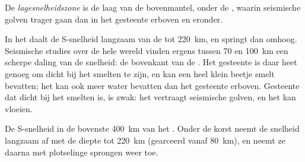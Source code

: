 \begin{definition}[Lagesnelheidszone]\label{def:g11:lithosphere-asthenosphere:lvz}
De \emph{lagesnelheidszone} is de laag van de bovenmantel,
onder de , waarin seismische golven trager gaan dan in het gesteente
erboven en eronder.
\end{definition}

In het  daalt de S-snelheid langzaam van de  tot
\qty{220}{km}, en springt dan omhoog. Seismische studies over de hele wereld vinden
ergens tussen 70 en \qty{100}{km} een scherpe daling van de snelheid: de bovenkant
van de . Het gesteente is daar heet genoeg om dicht bij het smelten te
zijn, en kan een heel klein beetje smelt bevatten; het kan ook meer water bevatten
dan het gesteente erboven. Gesteente dat dicht bij het smelten is, is zwak: het
vertraagt seismische golven, en het kan vloeien.

\begin{omfigure}

{\small De S-snelheid in de bovenste \qty{400}{km} van het . Onder de korst neemt de snelheid langzaam af met de diepte tot
\qty{220}{km} (gearceerd vanaf \qty{80}{km}), en neemt ze daarna met plotselinge
sprongen weer toe.}
\end{omfigure}

